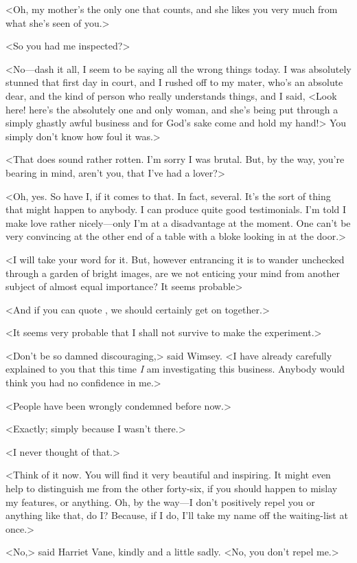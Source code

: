 <Oh, my mother's the only one that counts, and she likes you very much from what she's seen of you.>

<So you had me inspected?>

<No—dash it all, I seem to be saying all the wrong things today. I was absolutely stunned that first day in court, and I rushed off to my mater, who's an absolute dear, and the kind of person who really understands things, and I said, <Look here! here's the absolutely one and only woman, and she's being put through a simply ghastly awful business and for God's sake come and hold my hand!> You simply don't know how foul it was.>

<That does sound rather rotten. I'm sorry I was brutal. But, by the way, you're bearing in mind, aren't you, that I've had a lover?>

<Oh, yes. So have I, if it comes to that. In fact, several. It's the sort of thing that might happen to anybody. I can produce quite good testimonials. I'm told I make love rather nicely—only I'm at a disadvantage at the moment. One can't be very convincing at the other end of a table with a bloke looking in at the door.>

<I will take your word for it. But, however entrancing it is to wander unchecked through a garden of bright images, are we not enticing your mind from another subject of almost equal importance? It seems probable\longdash>

<And if you can quote , we should certainly get on together.>

<It seems very probable that I shall not survive to make the experiment.>

<Don't be so damned discouraging,> said Wimsey. <I have already carefully explained to you that this time \emph{I} am investigating this business. Anybody would think you had no confidence in me.>

<People have been wrongly condemned before now.>

<Exactly; simply because I wasn't there.>

<I never thought of that.>

<Think of it now. You will find it very beautiful and inspiring. It might even help to distinguish me from the other forty-six, if you should happen to mislay my features, or anything. Oh, by the way—I don't positively repel you or anything like that, do I? Because, if I do, I'll take my name off the waiting-list at once.>

<No,> said Harriet Vane, kindly and a little sadly. <No, you don't repel me.>

